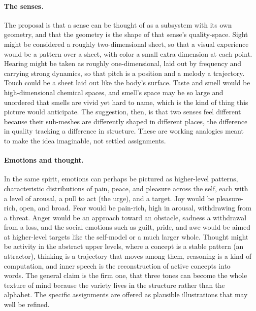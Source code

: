 \paragraph{The senses.}
The proposal is that a sense can be thought of as a subsystem with its own geometry, and that
the geometry is the shape of that sense's quality-space. Sight might be considered a roughly
two-dimensional sheet, so that a visual experience would be a pattern over a sheet, with color
a small extra dimension at each point. Hearing might be taken as roughly one-dimensional, laid
out by frequency and carrying strong dynamics, so that pitch is a position and a melody a
trajectory. Touch could be a sheet laid out like the body's surface. Taste and smell would be
high-dimensional chemical spaces, and smell's space may be so large and unordered that smells
are vivid yet hard to name, which is the kind of thing this picture would anticipate. The
suggestion, then, is that two senses feel different because their sub-meshes are differently
shaped in different places, the difference in quality tracking a difference in structure. These
are working analogies meant to make the idea imaginable, not settled assignments.

\paragraph{Emotions and thought.}
In the same spirit, emotions can perhaps be pictured as higher-level patterns, characteristic
distributions of pain, peace, and pleasure across the self, each with a level of arousal, a pull
to act (the urge), and a target. Joy would be pleasure-rich, open, and broad. Fear would
be pain-rich, high in arousal, withdrawing from a threat. Anger would be an approach toward an
obstacle, sadness a withdrawal from a loss, and the social emotions such as guilt, pride, and
awe would be aimed at higher-level targets like the self-model or a much larger whole. Thought might be activity in
the abstract upper levels, where a concept is a stable pattern (an attractor), thinking is a
trajectory that moves among them, reasoning is a kind of computation, and inner speech is the
reconstruction of active concepts into words. The general claim is the firm one, that three
tones can become the whole texture of mind because the variety lives in the structure rather
than the alphabet. The specific assignments are offered as plausible illustrations that may well
be refined.
